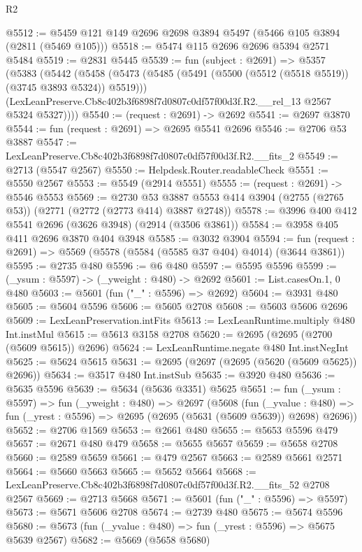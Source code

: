 \begin{lexlean}{R2}
\begin{coremodule}
@5512 := @5459 @121 @149 @2696 @2698 @3894 @5497 (@5466 @105 @3894 (@2811 (@5469 @105)))
@5518 := @5474 @115 @2696 @2696 @5394 @2571 @5484
@5519 := @2831 @5445
@5539 := fun (subject : @2691) =>
  @5357
    (@5383
      (@5442
        (@5458
          (@5473 (@5485 (@5491 (@5500 (@5512 (@5518 @5519)) (@3745 @3893 @5324)) @5519)))
          (LexLeanPreserve.Cb8c402b3f6898f7d0807c0df57f00d3f.R2.__rel_13 @2567 @5324 @5327))))
@5540 := (request : @2691) -> @2692
@5541 := @2697 @3870
@5544 := fun (request : @2691) => @2695 @5541 @2696
@5546 := @2706 @53 @3887
@5547 := LexLeanPreserve.Cb8c402b3f6898f7d0807c0df57f00d3f.R2.__fits_2
@5549 := @2713 (@5547 @2567)
@5550 := Helpdesk.Router.readableCheck
@5551 := @5550 @2567
@5553 := @5549 (@2914 @5551)
@5555 := (request : @2691) -> @5546 @5553
@5569 := @2730
    @53
    @3887
    @5553
    @414
    @3904
    (@2755 (@2765 @53))
    (@2771 (@2772 (@2773 @414) @3887 @2748))
@5578 := @3996 @400 @412 @5541 @2696 (@3626 @3948) (@2914 (@3506 @3861))
@5584 := @3958 @405 @411 @2696 @3870 @404 @3948
@5585 := @3032 @3904
@5594 := fun (request : @2691) => @5569 (@5578 (@5584 (@5585 @37 @404) @4014) (@3644 @3861))
@5595 := @2735 @480
@5596 := @6 @480
@5597 := @5595 @5596
@5599 := (_ysum : @5597) -> (_yweight : @480) -> @2692
@5601 := List.casesOn.{1, 0} @480
@5603 := @5601 (fun ("_" : @5596) => @2692)
@5604 := @3931 @480
@5605 := @5604 @5596
@5606 := @5605 @2708
@5608 := @5603 @5606 @2696
@5609 := LexLeanPreservation.intFits
@5613 := LexLeanRuntime.multiply @480 Int.instMul
@5615 := @5613 @3158 @2708
@5620 := @2695 (@2695 (@2700 (@5609 @5615)) @2696)
@5624 := LexLeanRuntime.negate @480 Int.instNegInt
@5625 := @5624 @5615
@5631 := @2695 (@2697 (@2695 (@5620 (@5609 @5625)) @2696))
@5634 := @3517 @480 Int.instSub
@5635 := @3920 @480
@5636 := @5635 @5596
@5639 := @5634 (@5636 @3351) @5625
@5651 := fun (_ysum : @5597) =>
  fun (_yweight : @480) =>
  @2697
    (@5608
      (fun (_yvalue : @480) =>
      fun (_yrest : @5596) => @2695 (@2695 (@5631 (@5609 @5639)) @2698) @2696))
@5652 := @2706 @1569
@5653 := @2661 @480
@5655 := @5653 @5596 @479
@5657 := @2671 @480 @479
@5658 := @5655 @5657
@5659 := @5658 @2708
@5660 := @2589 @5659
@5661 := @479 @2567
@5663 := @2589 @5661 @2571
@5664 := @5660 @5663
@5665 := @5652 @5664
@5668 := LexLeanPreserve.Cb8c402b3f6898f7d0807c0df57f00d3f.R2.__fits_52 @2708 @2567
@5669 := @2713 @5668
@5671 := @5601 (fun ("_" : @5596) => @5597)
@5673 := @5671 @5606 @2708
@5674 := @2739 @480
@5675 := @5674 @5596
@5680 := @5673 (fun (_yvalue : @480) => fun (_yrest : @5596) => @5675 @5639 @2567)
@5682 := @5669 (@5658 @5680)

\end{coremodule}
\end{lexlean}
